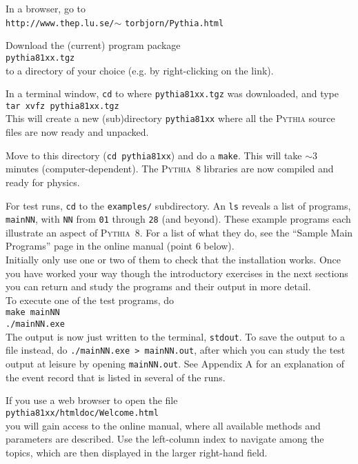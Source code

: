 \documentclass[12pt,a4paper]{article}
\newcounter{enumct}
\newenvironment{Enumerate}{\begin{list}{\arabic{enumct}.}%
{\usecounter{enumct}\setlength{\topsep}{0.4mm}%
\setlength{\partopsep}{0.4mm}\setlength{\itemsep}{0.4mm}%
\setlength{\parsep}{0.4mm}}}{\end{list}}
\begin{document}
\begin{Enumerate}
\item In a browser, go to\\
\hspace*{10mm}\texttt{http://www.thep.lu.se/}$\sim$%
\texttt{torbjorn/Pythia.html}
\item Download the (current) program package\\
\hspace*{10mm}\texttt{pythia81xx.tgz}\\
to a directory of your choice (e.g. by right-clicking on the link).
\item In a terminal window, \texttt{cd} to where \texttt{pythia81xx.tgz} 
was downloaded, and type\\
\hspace*{10mm}\texttt{tar xvfz pythia81xx.tgz}\\
This will create a new (sub)directory \texttt{pythia81xx} where all
the \textsc{Pythia} source files are now ready and unpacked.
\item Move to this directory (\texttt{cd pythia81xx}) and do a
\texttt{make}. This will take $\sim$3 minutes
(computer-dependent). The \textsc{Pythia}~8 libraries are now
compiled and ready for physics. 
\item For test runs, \texttt{cd} to the \texttt{examples/} subdirectory. 
An \texttt{ls} reveals a list of programs, \texttt{mainNN}, with
\texttt{NN} from \texttt{01} through \texttt{28} (and beyond). These 
example programs each illustrate an aspect of \textsc{Pythia}~8. 
For a list of what they do, see the ``Sample Main Programs'' page 
in the online manual (point 6 below).\\ 
Initially only use one or two of them to check that the installation
 works. Once you have worked your way though the introductory exercises 
in the next sections you can return and study the programs and their 
output in more detail.\\
To execute one of the test programs, do\\
\hspace*{10mm}\texttt{make mainNN}\\
\hspace*{10mm}\texttt{./mainNN.exe}\\
The output is now just written to the terminal, \texttt{stdout}. 
To save the output to a file instead, do 
\texttt{./mainNN.exe >  mainNN.out}, after which you can study the 
test output at leisure by opening \texttt{mainNN.out}. See Appendix A 
for an explanation of the event record that is listed in several of 
the runs.
\item If you use a web browser to open the file\\
\hspace*{10mm}\texttt{pythia81xx/htmldoc/Welcome.html}\\
you will gain access to the online manual, where all available methods 
and parameters are described. Use the left-column index to navigate among 
the topics, which are then displayed in the larger right-hand field. 
\end{Enumerate}
\end{document}
